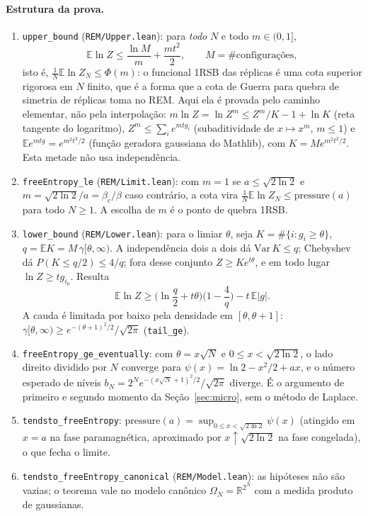 \documentclass[11pt,a4paper]{article}
\newcommand{\E}{\mathbb{E}}
\begin{document}
\paragraph{Estrutura da prova.}
\begin{enumerate}
\item \texttt{upper\_bound} (\texttt{REM/Upper.lean}): para \emph{todo} $N$ e todo $m\in(0,1]$,
\[
  \E\ln Z\le\frac{\ln M}{m}+\frac{mt^2}{2},\qquad M=\#\text{configurações},
\]
isto é, $\frac1N\E\ln Z_N\le\Phi(m)$: o funcional 1RSB das réplicas é uma cota superior rigorosa em
$N$ finito, que é a forma que a cota de Guerra para quebra de simetria de réplicas toma no REM. Aqui ela
é provada pelo caminho elementar, não pela interpolação: $m\ln Z=\ln Z^m\le Z^m/K-1+\ln K$
(reta tangente do logaritmo), $Z^m\le\sum_ie^{mtg_i}$ (subaditividade de $x\mapsto x^m$, $m\le1$) e
$\E e^{mtg}=e^{m^2t^2/2}$ (função geradora gaussiana do Mathlib), com $K=Me^{m^2t^2/2}$. Esta metade não
usa independência.
\item \texttt{freeEntropy\_le} (\texttt{REM/Limit.lean}): com $m=1$ se $a\le\sqrt{2\ln2}$ e
$m=\sqrt{2\ln2}/a=\beta_c/\beta$ caso contrário, a cota vira $\frac1N\E\ln Z_N\le\mathrm{pressure}(a)$ para
todo $N\ge1$. A escolha de $m$ é o ponto de quebra 1RSB.
\item \texttt{lower\_bound} (\texttt{REM/Lower.lean}): para o limiar $\theta$, seja
$K=\#\{i:g_i\ge\theta\}$, $q=\E K=M\,\gamma[\theta,\infty)$. A independência dois a dois dá
$\mathrm{Var}\,K\le q$; Chebyshev dá $P(K\le q/2)\le4/q$; fora desse conjunto $Z\ge Ke^{t\theta}$, e em todo
lugar $\ln Z\ge tg_{i_0}$. Resulta
\[
  \E\ln Z\ge\Big(\ln\frac q2+t\theta\Big)\Big(1-\frac4q\Big)-t\,\E|g|.
\]
A cauda é limitada por baixo pela densidade em $[\theta,\theta+1]$:
$\gamma[\theta,\infty)\ge e^{-(\theta+1)^2/2}/\sqrt{2\pi}$ (\texttt{tail\_ge}).
\item \texttt{freeEntropy\_ge\_eventually}: com $\theta=x\sqrt N$ e $0\le x<\sqrt{2\ln2}$, o lado direito
dividido por $N$ converge para $\psi(x)=\ln2-x^2/2+ax$, e o número esperado de níveis
$b_N=2^Ne^{-(x\sqrt N+1)^2/2}/\sqrt{2\pi}$ diverge. É o argumento de primeiro e segundo momento da
Seção~\ref{sec:micro}, sem o método de Laplace.
\item \texttt{tendsto\_freeEntropy}: $\mathrm{pressure}(a)=\sup_{0\le x<\sqrt{2\ln2}}\psi(x)$ (atingido em
$x=a$ na fase paramagnética, aproximado por $x\uparrow\sqrt{2\ln2}$ na fase congelada), o que fecha o
limite.
\item \texttt{tendsto\_freeEntropy\_canonical} (\texttt{REM/Model.lean}): as hipóteses não são vazias;
o teorema vale no modelo canônico $\Omega_N=\mathbb R^{2^N}$ com a medida produto de gaussianas.
\end{enumerate}
\end{document}
